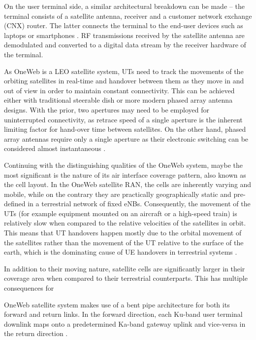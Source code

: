 \documentclass[english, 12pt, a4paper, elec, utf8, a-1b, online]{aaltothesis}
\begin{document}
On the user terminal side, a similar architectural breakdown can be made – the terminal consists of a satellite antenna, receiver and a customer network exchange (CNX) router.
The latter connects the terminal to the end-user devices such as laptops or smartphones \cite{henri2020oneweb}. RF transmissions received by the satellite antenna are demodulated and converted to a digital data stream by the receiver hardware of the terminal.

As OneWeb is a LEO satellite system, UTs need to track the movements of the orbiting satellites in real-time and handover between them as they move in and out of view in order to maintain constant connectivity.
This can be achieved either with traditional steerable dish or more modern phased array antenna designs.
With the prior, two apertures may need to be employed for uninterrupted connectivity, as retrace speed of a single aperture is the inherent limiting factor for hand-over time between satellites.
On the other hand, phased array antennas require only a single aperture as their electronic switching can be considered almost instantaneous \cite{worldvu2016loi}.

Continuing with the distinguishing qualities of the OneWeb system, maybe the most significant is the nature of its air interface coverage pattern, also known as the cell layout.
In the OneWeb satellite RAN, the cells are inherently varying and mobile, while on the contrary they are practically geographically static and pre-defined in a terrestrial network of fixed eNBs.
Consequently, the movement of the UTs (for example equipment mounted on an aircraft or a high-speed train) is relatively slow when compared to the relative velocities of the satellites in orbit.
This means that UT handovers happen mostly due to the orbital movement of the satellites rather than the movement of the UT relative to the surface of the earth, which is the dominating cause of UE handovers in terrestrial systems \cite{corson2019admission}.

In addition to their moving nature, satellite cells are significantly larger in their coverage area when compared to their terrestrial counterparts.
This has multiple consequences for \cite{corson2019admission}

OneWeb satellite system makes use of a bent pipe architecture for both its forward and return links.
In the forward direction, each Ku-band user terminal downlink maps onto a predetermined Ka-band gateway uplink and vice-versa in the return direction \cite{worldvu2016loi, portillo2019technical}.
\end{document}
